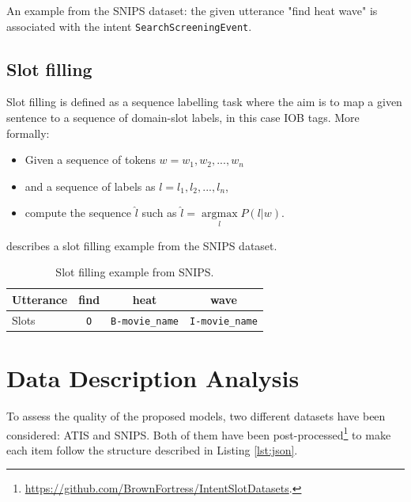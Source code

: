 \documentclass[a4paper]{article}
\begin{document}
An example from the SNIPS dataset: the given utterance "find heat wave" is associated with the intent \texttt{SearchScreeningEvent}.

\subsection{Slot filling}
Slot filling is defined as a sequence labelling task where the aim is to map a given sentence to a sequence of domain-slot labels, in this case IOB tags.
More formally:
\begin{itemize}
    \item Given a sequence of tokens $w = {w_1, w_2, ..., w_n}$
    \item and a sequence of labels as $l = {l_1, l_2, ..., l_n}$, \item compute the sequence $\hat{l}$ such as $\hat{l} = \underset{l}{\operatorname{argmax}} P(l|w)$.
\end{itemize}
 describes a slot filling example from the SNIPS dataset.

\begin{table}[!h]
    \centering
    \begin{tabular}{lccc}
        \toprule
            Utterance & find & heat & wave\\
        \midrule
            Slots & \texttt{O} & \texttt{B-movie\_name} & \texttt{I-movie\_name} \\
        \bottomrule
    \end{tabular}
    \caption{Slot filling example from SNIPS.}
    \label{tab:slotfillingexample}
\end{table}

\section{Data Description Analysis}

To assess the quality of the proposed models, two different datasets have been considered: ATIS and SNIPS. Both of them have been post-processed\footnote{\url{https://github.com/BrownFortress/IntentSlotDatasets}.} to make each item follow the structure described in Listing \ref{lst:json}.
\end{document}
